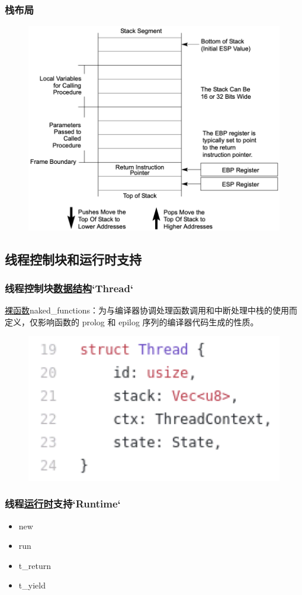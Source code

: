 \begin{frame}[fragile]
    \frametitle{栈布局}
% 
% 
	\begin{figure}
		\centering
		\includegraphics[width=0.55\linewidth]{figs/stack-structure.png}
	\end{figure}


% 
% 
% 
\end{frame}
\subsection{线程控制块和运行时支持}
\begin{frame}[fragile]
    \frametitle{线程控制块\href{https://github.com/cfsamson/example-greenthreads/blob/master/src/main.rs\#L19}{数据结构}`Thread`}
% 
\href{https://docs.microsoft.com/zh-cn/cpp/c-language/naked-functions}{裸函数}naked\_functions：为与编译器协调处理函数调用和中断处理中栈的使用而定义，仅影响函数的 prolog 和 epilog 序列的编译器代码生成的性质。
% 
	\begin{figure}
		\centering
		\includegraphics[width=0.5\linewidth]{figs/thread.png}
	\end{figure}


% 
\end{frame}
\begin{frame}[fragile]
    \frametitle{线程\href{https://github.com/cfsamson/example-greenthreads/blob/master/src/main.rs\#L49}{运行时}支持`Runtime`}
% 
    \begin{itemize}
        \item new
        \item run
        \item t\_return
        \item t\_yield
    \end{itemize}
% 
\end{frame}

